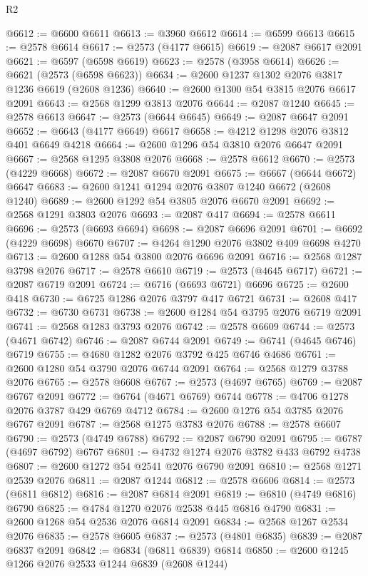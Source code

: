 \begin{lexlean}{R2}
\begin{coremodule}
@6612 := @6600 @6611
@6613 := @3960 @6612
@6614 := @6599 @6613
@6615 := @2578 @6614
@6617 := @2573 (@4177 @6615)
@6619 := @2087 @6617 @2091
@6621 := @6597 (@6598 @6619)
@6623 := @2578 (@3958 @6614)
@6626 := @6621 (@2573 (@6598 @6623))
@6634 := @2600 @1237 @1302 @2076 @3817 @1236 @6619 (@2608 @1236)
@6640 := @2600 @1300 @54 @3815 @2076 @6617 @2091
@6643 := @2568 @1299 @3813 @2076
@6644 := @2087 @1240
@6645 := @2578 @6613
@6647 := @2573 (@6644 @6645)
@6649 := @2087 @6647 @2091
@6652 := @6643 (@4177 @6649) @6617
@6658 := @4212 @1298 @2076 @3812 @401 @6649 @4218
@6664 := @2600 @1296 @54 @3810 @2076 @6647 @2091
@6667 := @2568 @1295 @3808 @2076
@6668 := @2578 @6612
@6670 := @2573 (@4229 @6668)
@6672 := @2087 @6670 @2091
@6675 := @6667 (@6644 @6672) @6647
@6683 := @2600 @1241 @1294 @2076 @3807 @1240 @6672 (@2608 @1240)
@6689 := @2600 @1292 @54 @3805 @2076 @6670 @2091
@6692 := @2568 @1291 @3803 @2076
@6693 := @2087 @417
@6694 := @2578 @6611
@6696 := @2573 (@6693 @6694)
@6698 := @2087 @6696 @2091
@6701 := @6692 (@4229 @6698) @6670
@6707 := @4264 @1290 @2076 @3802 @409 @6698 @4270
@6713 := @2600 @1288 @54 @3800 @2076 @6696 @2091
@6716 := @2568 @1287 @3798 @2076
@6717 := @2578 @6610
@6719 := @2573 (@4645 @6717)
@6721 := @2087 @6719 @2091
@6724 := @6716 (@6693 @6721) @6696
@6725 := @2600 @418
@6730 := @6725 @1286 @2076 @3797 @417 @6721
@6731 := @2608 @417
@6732 := @6730 @6731
@6738 := @2600 @1284 @54 @3795 @2076 @6719 @2091
@6741 := @2568 @1283 @3793 @2076
@6742 := @2578 @6609
@6744 := @2573 (@4671 @6742)
@6746 := @2087 @6744 @2091
@6749 := @6741 (@4645 @6746) @6719
@6755 := @4680 @1282 @2076 @3792 @425 @6746 @4686
@6761 := @2600 @1280 @54 @3790 @2076 @6744 @2091
@6764 := @2568 @1279 @3788 @2076
@6765 := @2578 @6608
@6767 := @2573 (@4697 @6765)
@6769 := @2087 @6767 @2091
@6772 := @6764 (@4671 @6769) @6744
@6778 := @4706 @1278 @2076 @3787 @429 @6769 @4712
@6784 := @2600 @1276 @54 @3785 @2076 @6767 @2091
@6787 := @2568 @1275 @3783 @2076
@6788 := @2578 @6607
@6790 := @2573 (@4749 @6788)
@6792 := @2087 @6790 @2091
@6795 := @6787 (@4697 @6792) @6767
@6801 := @4732 @1274 @2076 @3782 @433 @6792 @4738
@6807 := @2600 @1272 @54 @2541 @2076 @6790 @2091
@6810 := @2568 @1271 @2539 @2076
@6811 := @2087 @1244
@6812 := @2578 @6606
@6814 := @2573 (@6811 @6812)
@6816 := @2087 @6814 @2091
@6819 := @6810 (@4749 @6816) @6790
@6825 := @4784 @1270 @2076 @2538 @445 @6816 @4790
@6831 := @2600 @1268 @54 @2536 @2076 @6814 @2091
@6834 := @2568 @1267 @2534 @2076
@6835 := @2578 @6605
@6837 := @2573 (@4801 @6835)
@6839 := @2087 @6837 @2091
@6842 := @6834 (@6811 @6839) @6814
@6850 := @2600 @1245 @1266 @2076 @2533 @1244 @6839 (@2608 @1244)

\end{coremodule}
\end{lexlean}
